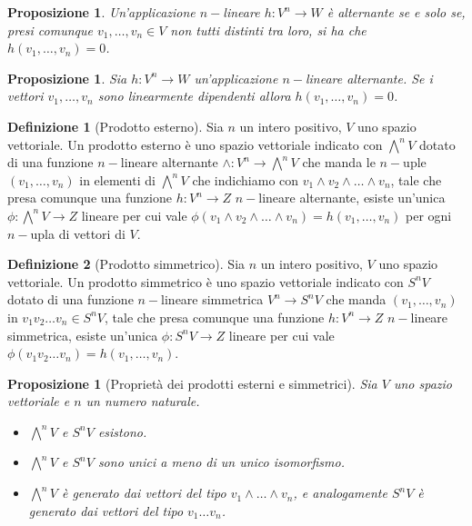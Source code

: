 \documentclass[11pt]{article}
\theoremstyle{plain}
\newtheorem{prop}[thm]{Proposizione}
\theoremstyle{definition}
\newtheorem{defn}{Definizione}[section]
\theoremstyle{remark}
\begin{document}
\begin{prop}
  Un'applicazione $n-$lineare $h: V^n \to W$ è alternante se e solo se, presi comunque $v_1,\dots,v_n\in V$
  non tutti distinti tra loro, si ha che $h(v_1,\dots,v_n)=0$.
\end{prop}

\begin{prop}
  Sia $h: V^n \to W$ un'applicazione $n-$lineare alternante. Se i vettori $v_1,\dots,v_n$ sono linearmente dipendenti allora
  $h(v_1,\dots,v_n)=0$.
\end{prop}


\begin{defn}[Prodotto esterno]
Sia $n$ un intero positivo, $V$ uno spazio vettoriale. Un prodotto esterno è uno spazio vettoriale indicato con $\bigwedge^n V$
dotato di una funzione $n-$lineare alternante $\wedge: V^n \to \bigwedge^n V$ che manda le $n-$uple $(v_1,\ldots,v_n)$ in
elementi di $\bigwedge^n V$ che indichiamo con $v_1\wedge v_2\wedge\ldots\wedge v_n$,
tale che presa comunque una funzione $h: V^n \to Z$ $n-$lineare alternante,
esiste un'unica $\phi: \bigwedge^n V \to Z $ lineare per cui vale $\phi(v_1\wedge v_2\wedge \ldots \wedge v_n)=h(v_1,\ldots,v_n)$
per ogni $n-$upla di vettori di $V$.
\label{defn:prodotto esterno}
\end{defn}

\begin{defn}[Prodotto simmetrico]
Sia $n$ un intero positivo, $V$ uno spazio vettoriale. Un prodotto simmetrico è uno spazio vettoriale indicato con $S^n V$
dotato di una funzione $n-$lineare simmetrica $V^n \to S^n V$ che manda $(v_1,\ldots,v_n)$ in
$v_1 v_2\ldots v_n \in S^n V$, tale che presa comunque una funzione $h: V^n \to Z$ $n-$lineare simmetrica,
esiste un'unica $\phi: S^n V \to Z $ lineare per cui vale $\phi(v_1 v_2 \ldots v_n)=h(v_1,\ldots,v_n)$.
\label{defn:prodotto simmetrico}
\end{defn}


\begin{prop}[Proprietà dei prodotti esterni e simmetrici]
Sia $V$ uno spazio vettoriale e $n$ un numero naturale.
\begin{itemize}
\item $\bigwedge^nV$ e $S^nV$ esistono.
\item $\bigwedge^nV$ e $S^nV$ sono unici a meno di un unico isomorfismo.
\item $\bigwedge^nV$ è generato dai vettori del tipo $v_1\wedge \dots \wedge v_n$, e analogamente
      $S^nV$ è generato dai vettori del tipo $v_1\dots v_n$.
\end{itemize}
\end{prop}
\end{document}
